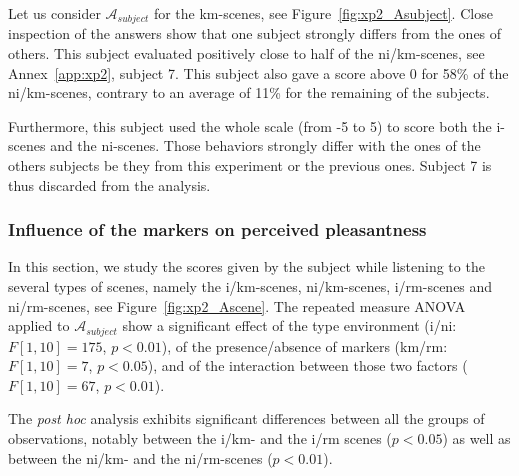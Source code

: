 \documentclass[12pt]{elsarticle}
\begin{document}
Let us consider $\mathcal{A}_{subject}$ for the km-scenes, see Figure~\ref{fig:xp2_Asubject}. Close inspection of the answers show that one subject strongly differs from the ones of others. This subject evaluated positively close to half of the ni/km-scenes, see Annex~\ref{app:xp2}, subject 7. This subject also gave a score above 0 for 58\% of the ni/km-scenes, contrary to an average of 11\% for the remaining of the subjects.

Furthermore, this subject used the whole scale (from -5 to 5) to score both the i-scenes and the ni-scenes. Those behaviors strongly differ with the ones of the others subjects be they from this experiment or the previous ones. Subject 7 is thus discarded from the analysis.

\subsubsection{Influence of the markers on perceived pleasantness}


In this section, we study the scores given by the subject while listening to the several types of scenes, namely the i/km-scenes, ni/km-scenes, i/rm-scenes and ni/rm-scenes, see Figure~\ref{fig:xp2_Ascene}. The repeated measure ANOVA applied to $\mathcal{A}_{subject}$ show a significant effect of the type environment (i/ni: $F[1,10]=175$, $p<0.01$), of the presence/absence of markers (km/rm: $F[1,10]=7$, $p<0.05$), and of the interaction between those two factors ($F[1,10]=67$, $p<0.01$).


The \emph{post hoc} analysis exhibits significant differences between all the groups of observations, notably between the i/km- and the i/rm scenes ($p<0.05$) as well as between the ni/km- and the ni/rm-scenes ($p<0.01$).

\end{document}
